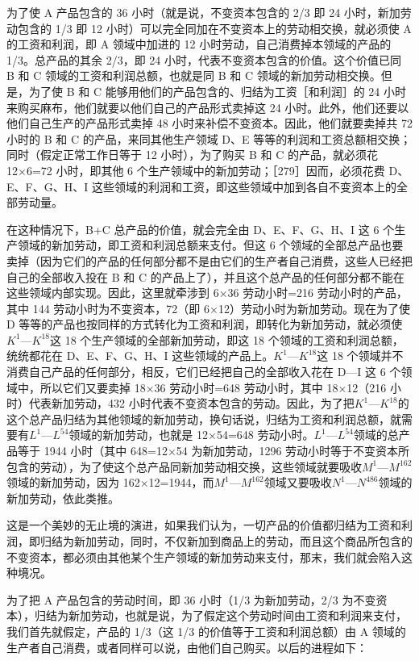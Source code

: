 为了使 A 产品包含的 36 小时（就是说，不变资本包含的 2/3 即 24 小时，新加劳动包含的 1/3 即 12 小时）可以完全同加在不变资本上的劳动相交换，就必须使 A 的工资和利润，即 A 领域中加进的 12 小时劳动，自己消费掉本领域的产品的 1/3。总产品的其余 2/3，即 24 小时，代表不变资本包含的价值。这个价值已同 B 和 C 领域的工资和利润总额，也就是同 B 和 C 领域的新加劳动相交换。但是，为了使 B 和 C 能够用他们的产品包含的、归结为工资［和利润］的 24 小时来购买麻布，他们就要以他们自己的产品形式卖掉这 24 小时。此外，他们还要以他们自己生产的产品形式卖掉 48 小时来补偿不变资本。因此，他们就要卖掉共 72 小时的 B 和 C 的产品，来同其他生产领域 D、E 等等的利润和工资总额相交换；同时（假定正常工作日等于 12 小时），为了购买 B 和 C 的产品，就必须花 12×6=72 小时，即其他 6 个生产领域中的新加劳动；［279］因而，必须花费 D、E、F、G、H、I 这些领域的利润和工资，即这些领域中加到各自不变资本上的全部劳动量。

在这种情况下，B+C 总产品的价值，就会完全由 D、E、F、G、H、I 这 6 个生产领域的新加劳动，即工资和利润总额来支付。但这 6 个领域的全部总产品也要卖掉（因为它们的产品的任何部分都不是由它们的生产者自己消费，这些人已经把自己的全部收入投在 B 和 C 的产品上了），并且这个总产品的任何部分都不能在这些领域内部实现。因此，这里就牵涉到 6×36 劳动小时=216 劳动小时的产品，其中 144 劳动小时为不变资本，72（即 6×12）劳动小时为新加劳动。现在为了使 D 等等的产品也按同样的方式转化为工资和利润，即转化为新加劳动，就必须使$K^{1}$—$K^{18}$这 18 个生产领域的全部新加劳动，即这 18 个领域的工资和利润总额，统统都花在 D、E、F、G、H、I 这些领域的产品上。$K^{1}$—$K^{18}$这 18 个领域并不消费自己产品的任何部分，相反，它们已经把自己的全部收入花在 D—I 这 6 个领域中，所以它们又要卖掉 18×36 劳动小时=648 劳动小时，其中 18×12（216 小时）代表新加劳动，432 小时代表不变资本包含的劳动。因此，为了把$K^{1}$—$K^{18}$的这个总产品归结为其他领域的新加劳动，换句话说，归结为工资和利润总额，就需要有$L^{1}$—$L^{54}$领域的新加劳动，也就是 12×54=648 劳动小时。$L^{1}$—$L^{54}$领域的总产品等于 1944 小时（其中 648=12×54 为新加劳动，1296 劳动小时等于不变资本所包含的劳动），为了使这个总产品同新加劳动相交换，这些领域就要吸收$M^{1}$—$M^{162}$领域的新加劳动，因为 162×12=1944，而$M^{1}$—$M^{162}$领域又要吸收$N^{1}$—$N^{486}$领域的新加劳动，依此类推。

这是一个美妙的无止境的演进，如果我们认为，一切产品的价值都归结为工资和利润，即归结为新加劳动，同时，不仅新加到商品上的劳动，而且这个商品所包含的不变资本，都必须由其他某个生产领域的新加劳动来支付，那末，我们就会陷入这种境况。

为了把 A 产品包含的劳动时间，即 36 小时（1/3 为新加劳动，2/3 为不变资本），归结为新加劳动，也就是说，为了假定这个劳动时间由工资和利润来支付，我们首先就假定，产品的 1/3（这 1/3 的价值等于工资和利润总额）由 A 领域的生产者自己消费，或者同样可以说，由他们自己购买。以后的进程如下：

